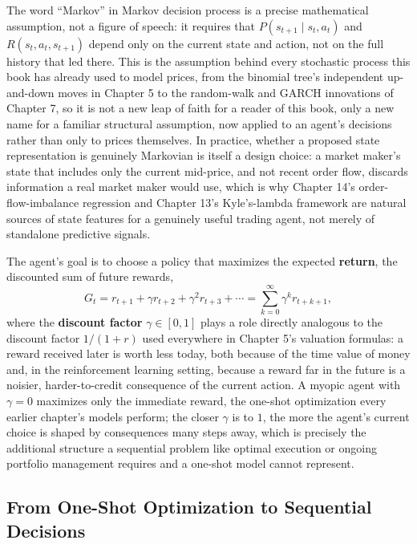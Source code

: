 \documentclass[../ai_in_finance]{subfiles}
\begin{document}
The word ``Markov'' in Markov decision process is a precise mathematical assumption, not a figure of speech: it requires that $P(s_{t+1} \mid s_t, a_t)$ and $R(s_t, a_t, s_{t+1})$ depend only on the current state and action, not on the full history that led there. This is the assumption behind every stochastic process this book has already used to model prices, from the binomial tree's independent up-and-down moves in Chapter 5 to the random-walk and GARCH innovations of Chapter 7, so it is not a new leap of faith for a reader of this book, only a new name for a familiar structural assumption, now applied to an agent's decisions rather than only to prices themselves. In practice, whether a proposed state representation is genuinely Markovian is itself a design choice: a market maker's state that includes only the current mid-price, and not recent order flow, discards information a real market maker would use, which is why Chapter 14's order-flow-imbalance regression and Chapter 13's Kyle's-lambda framework are natural sources of state features for a genuinely useful trading agent, not merely of standalone predictive signals.

The agent's goal is to choose a policy that maximizes the expected \textbf{return}, the discounted sum of future rewards,
\begin{equation*}
G_t = r_{t+1} + \gamma r_{t+2} + \gamma^2 r_{t+3} + \cdots = \sum_{k=0}^{\infty} \gamma^k r_{t+k+1},
\end{equation*}
where the \textbf{discount factor} $\gamma \in [0,1]$ plays a role directly analogous to the discount factor $1/(1+r)$ used everywhere in Chapter 5's valuation formulas: a reward received later is worth less today, both because of the time value of money and, in the reinforcement learning setting, because a reward far in the future is a noisier, harder-to-credit consequence of the current action. A myopic agent with $\gamma = 0$ maximizes only the immediate reward, the one-shot optimization every earlier chapter's models perform; the closer $\gamma$ is to $1$, the more the agent's current choice is shaped by consequences many steps away, which is precisely the additional structure a sequential problem like optimal execution or ongoing portfolio management requires and a one-shot model cannot represent.

\subsection{From One-Shot Optimization to Sequential Decisions}
\label{sec:rl-bridge}
\end{document}
